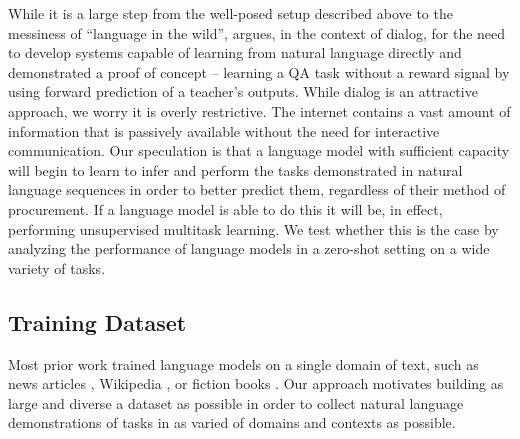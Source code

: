 \documentclass{article}
\begin{document}
While it is a large step from the well-posed setup described above to the messiness of ``language in the wild'', \citet{weston2016dialog} argues, in the context of dialog, for the need to develop systems capable of learning from natural language directly and demonstrated a proof of concept -- learning a QA task without a reward signal by using forward prediction of a teacher's outputs. While dialog is an attractive approach, we worry it is overly restrictive. The internet contains a vast amount of information that is passively available without the need for interactive communication. Our speculation is that a language model with sufficient capacity will begin to learn to infer and perform the tasks demonstrated in natural language sequences in order to better predict them, regardless of their method of procurement. If a language model is able to do this it will be, in effect, performing unsupervised multitask learning. We test whether this is the case by analyzing the performance of language models in a zero-shot setting on a wide variety of tasks.


\subsection{Training Dataset}

Most prior work trained language models on a single domain of text, such as news articles \cite{jozefowicz2016exploring}, Wikipedia \cite{merity2016pointer}, or fiction books \cite{kiros2015skip}. Our approach motivates building as large and diverse a dataset as possible in order to collect natural language demonstrations of tasks in as varied of domains and contexts as possible.
\end{document}

